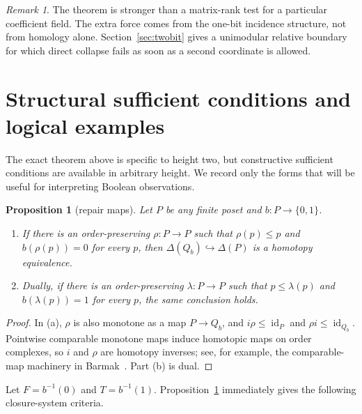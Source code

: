 \documentclass[11pt]{article}
\newtheorem{proposition}[theorem]{Proposition}
\theoremstyle{definition}
\theoremstyle{remark}
\newtheorem{remark}[theorem]{Remark}
\newcommand{\D}{\Delta}
\begin{document}
\begin{remark}
The theorem is stronger than a matrix-rank test for a particular coefficient field.
The extra force comes from the one-bit incidence structure, not from homology alone.
Section~\ref{sec:twobit} gives a unimodular relative boundary for which direct collapse
fails as soon as a second coordinate is allowed.
\end{remark}

\section{Structural sufficient conditions and logical examples}\label{sec:criteria}

The exact theorem above is specific to height two, but constructive sufficient
conditions are available in arbitrary height.  We record only the forms that will be
useful for interpreting Boolean observations.

\begin{proposition}[repair maps]\label{prop:repairmaps}
Let $P$ be any finite poset and $b:P\to\{0,1\}$.
\begin{enumerate}[label=(\alph*)]
\item If there is an order-preserving $\rho:P\to P$ such that
$\rho(p)\le p$ and $b(\rho(p))=0$ for every $p$, then
$\D(Q_b)\hookrightarrow\D(P)$ is a homotopy equivalence.
\item Dually, if there is an order-preserving $\lambda:P\to P$ such that
$p\le\lambda(p)$ and $b(\lambda(p))=1$ for every $p$, the same conclusion holds.
\end{enumerate}
\end{proposition}

\begin{proof}
In (a), $\rho$ is also monotone as a map $P\to Q_b$, and
$i\rho\le\operatorname{id}_P$ and $\rho i\le\operatorname{id}_{Q_b}$.  Pointwise
comparable monotone maps induce homotopic maps on order complexes, so $i$ and $\rho$
are homotopy inverses; see, for example, the comparable-map machinery in
Barmak~\cite{Barmak2011A}.  Part (b) is dual.
\end{proof}

Let $F=b^{-1}(0)$ and $T=b^{-1}(1)$.  Proposition~\ref{prop:repairmaps} immediately
gives the following closure-system criteria.
\end{document}
